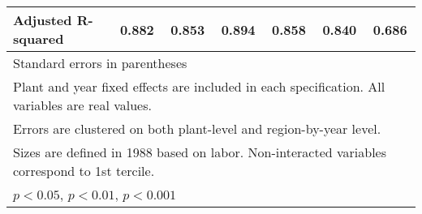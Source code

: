 \begin{table}[htbp]
\begin{tabular}{l*{6}{c}}
Adjusted R-squared&    0.882         &    0.853         &    0.894         &    0.858         &    0.840         &    0.686         \\
\bottomrule
\multicolumn{7}{l}{\footnotesize Standard errors in parentheses}\\
\multicolumn{7}{l}{\footnotesize Plant and year fixed effects are included in each specification. All variables are real values.}\\
\multicolumn{7}{l}{\footnotesize Errors are clustered on both plant-level and region-by-year level.}\\
\multicolumn{7}{l}{\footnotesize Sizes are defined in 1988 based on labor. Non-interacted variables correspond to 1st tercile.}\\
\multicolumn{7}{l}{\footnotesize \sym{*} \(p<0.05\), \sym{**} \(p<0.01\), \sym{***} \(p<0.001\)}\\
\end{tabular}
\end{table}
